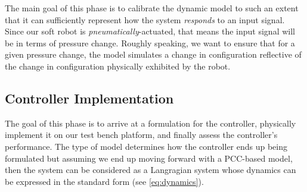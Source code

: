 The main goal of this phase is to calibrate the dynamic model to such an extent that it can sufficiently represent how the system \textit{responds} to an input signal. Since our soft robot is \textit{pneumatically}-actuated, that means the input signal will be in terms of pressure change. Roughly speaking, we want to ensure that for a given pressure change, the model simulates a change in configuration reflective of the change in configuration physically exhibited by the robot.   
\subsection{Controller Implementation}
The goal of this phase is to arrive at a formulation for the controller, physically implement it on our test bench platform, and finally assess the controller's performance. The type of model determines how the controller ends up being formulated but assuming we end up moving forward with a PCC-based model, then the system can be considered as a Langragian system whose dynamics can be expressed in the standard form (see \autoref{eq:dynamics}).

